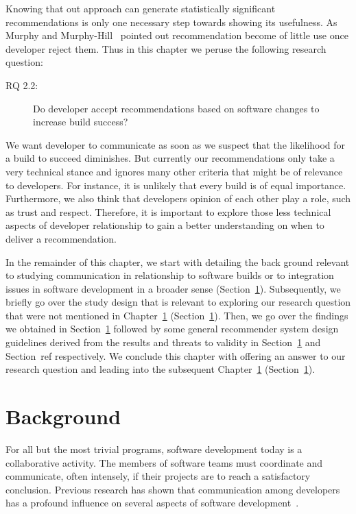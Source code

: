 \label{chap:talk}
Knowing that out approach can generate statistically significant recommendations is only one necessary step towards showing its usefulness.
As Murphy and Murphy-Hill~\cite{murphy:rsse:2010} pointed out recommendation become of little use once developer reject them.
Thus in this chapter we peruse the following research question:

\begin{description}
  \item[RQ 2.2:] Do developer accept recommendations based on software changes to increase build success? 
\end{description}

We want developer to communicate as soon as we suspect that the likelihood for a build to succeed diminishes.
But currently our recommendations only take a very technical stance and ignores many other criteria that might be of relevance to developers.
For instance, it is unlikely that every build is of equal importance.
Furthermore, we also think that developers opinion of each other play a role, such as trust and respect.
Therefore, it is important to explore those less technical aspects of developer relationship to gain a better understanding on when to deliver a recommendation.

In the remainder of this chapter, we start with detailing the back ground relevant to studying communication in relationship to software builds or to integration issues in software development in a broader sense (Section~\ref{}).
Subsequently, we briefly go over the study design that is relevant to exploring our research question that were not mentioned in Chapter~\ref{} (Section~\ref{}).
Then, we go over the findings we obtained in Section~\ref{} followed by some general recommender system design guidelines derived from the results and threats to validity in Section~\ref{} and Section~ref{} respectively.
We conclude this chapter with offering an answer to our research question and leading into the subsequent Chapter~\ref{} (Section~\ref{}).

\section{Background}
For all but the most trivial programs, software development today is a collaborative activity. The members of software teams must coordinate and communicate, often intensely, if their projects are to reach a satisfactory conclusion.
Previous research has shown that communication among developers has a profound influence on several aspects of software development~\cite{hinds:cscw:2006,wolf:icse:2009}.

